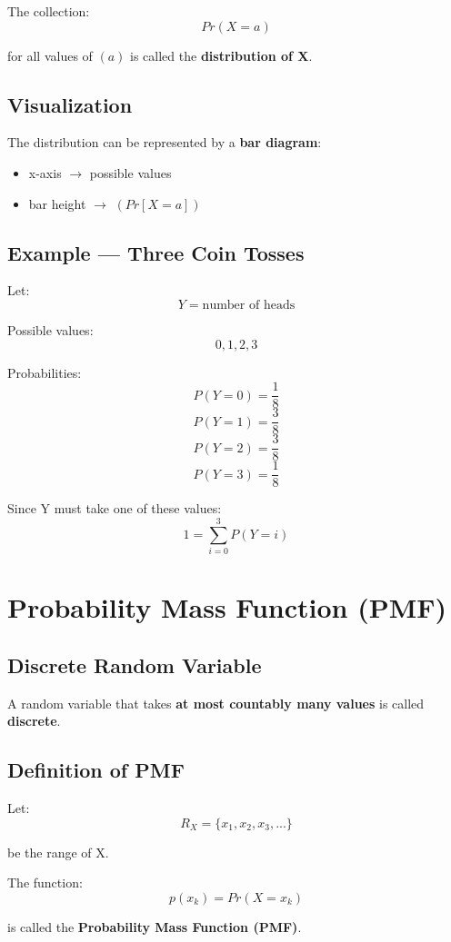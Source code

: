 \documentclass[12pt]{article}
\begin{document}
The collection:
\[
Pr(X=a)
\]

for all values of $(a)$ is called the \textbf{distribution of X}.

\subsection{Visualization}

The distribution can be represented by a \textbf{bar diagram}:

\begin{itemize}
\item x-axis $\rightarrow$ possible values
\item bar height $\rightarrow$ $(Pr[X=a])$
\end{itemize}

\subsection{Example — Three Coin Tosses}

Let:
\[
Y = \text{number of heads}
\]

Possible values:
\[
0,1,2,3
\]

Probabilities:
\[
P(Y=0)=\frac{1}{8}
\]
\[
P(Y=1)=\frac{3}{8}
\]
\[
P(Y=2)=\frac{3}{8}
\]
\[
P(Y=3)=\frac{1}{8}
\]

Since Y must take one of these values:
\[
1 = \sum_{i=0}^3 P(Y=i)
\]

\section{Probability Mass Function (PMF)}

\subsection{Discrete Random Variable}

A random variable that takes \textbf{at most countably many values} is called \textbf{discrete}.

\subsection{Definition of PMF}

Let:
\[
R_X = \{x_1, x_2, x_3, ...\}
\]

be the range of X.

The function:
\[
p(x_k) = Pr(X = x_k)
\]

is called the \textbf{Probability Mass Function (PMF)}.
\end{document}
